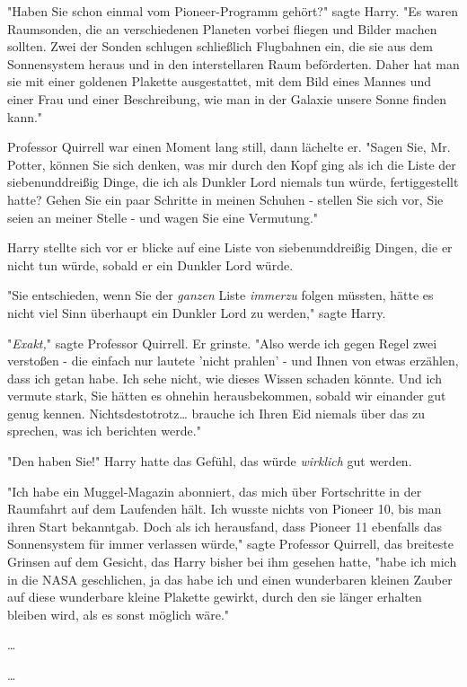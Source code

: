 {"Haben Sie schon einmal vom Pioneer-Programm gehört?" sagte Harry. "Es waren Raumsonden, die an verschiedenen Planeten vorbei fliegen und Bilder machen sollten. Zwei der Sonden schlugen schließlich Flugbahnen ein, die sie aus dem Sonnensystem heraus und in den interstellaren Raum beförderten. Daher hat man sie mit einer goldenen Plakette ausgestattet, mit dem Bild eines Mannes und einer Frau und einer Beschreibung, wie man in der Galaxie unsere Sonne finden kann."

Professor Quirrell war einen Moment lang still, dann lächelte er. "Sagen Sie, Mr. Potter, können Sie sich denken, was mir durch den Kopf ging als ich die Liste der siebenunddreißig Dinge, die ich als Dunkler Lord niemals tun würde, fertiggestellt hatte? Gehen Sie ein paar Schritte in meinen Schuhen - stellen Sie sich vor, Sie seien an meiner Stelle - und wagen Sie eine Vermutung."

Harry stellte sich vor er blicke auf eine Liste von siebenunddreißig Dingen, die er nicht tun würde, sobald er ein Dunkler Lord würde.

"Sie entschieden, wenn Sie der \emph{ganzen} Liste \emph{immerzu} folgen müssten, hätte es nicht viel Sinn überhaupt ein Dunkler Lord zu werden," sagte Harry.

"\emph{Exakt,}" sagte Professor Quirrell. Er grinste. "Also werde ich gegen Regel zwei verstoßen - die einfach nur lautete 'nicht prahlen' - und Ihnen von etwas erzählen, dass ich getan habe. Ich sehe nicht, wie dieses Wissen schaden könnte. Und ich vermute stark, Sie hätten es ohnehin herausbekommen, sobald wir einander gut genug kennen. Nichtsdestotrotz… brauche ich Ihren Eid niemals über das zu sprechen, was ich berichten werde."

"Den haben Sie!" Harry hatte das Gefühl, das würde \emph{wirklich} gut werden.

"Ich habe ein Muggel-Magazin abonniert, das mich über Fortschritte in der Raumfahrt auf dem Laufenden hält. Ich wusste nichts von Pioneer 10, bis man ihren Start bekanntgab. Doch als ich herausfand, dass Pioneer 11 ebenfalls das Sonnensystem für immer verlassen würde," sagte Professor Quirrell, das breiteste Grinsen auf dem Gesicht, das Harry bisher bei ihm gesehen hatte, "habe ich mich in die NASA geschlichen, ja das habe ich und einen wunderbaren kleinen Zauber auf diese wunderbare kleine Plakette gewirkt, durch den sie länger erhalten bleiben wird, als es sonst möglich wäre."

…

…

}
